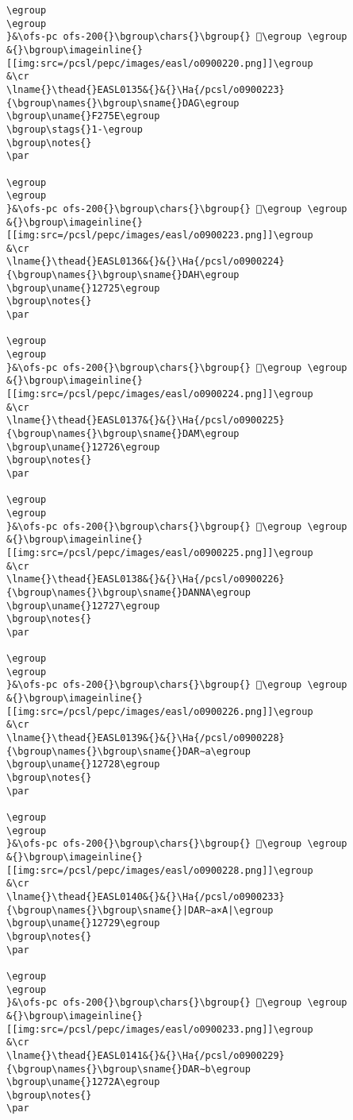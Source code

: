 \begin{verbatim}
\egroup
\egroup
}&\ofs-pc ofs-200{}\bgroup\chars{}\bgroup{} 𒜤\egroup \egroup
&{}\bgroup\imageinline{}[[img:src=/pcsl/pepc/images/easl/o0900220.png]]\egroup
&\cr
\lname{}\thead{}EASL0135&{}&{}\Ha{/pcsl/o0900223}{\bgroup\names{}\bgroup\sname{}DAG\egroup
\bgroup\uname{}F275E\egroup
\bgroup\stags{}1-\egroup
\bgroup\notes{}
\par 

\egroup
\egroup
}&\ofs-pc ofs-200{}\bgroup\chars{}\bgroup{} 󲝞\egroup \egroup
&{}\bgroup\imageinline{}[[img:src=/pcsl/pepc/images/easl/o0900223.png]]\egroup
&\cr
\lname{}\thead{}EASL0136&{}&{}\Ha{/pcsl/o0900224}{\bgroup\names{}\bgroup\sname{}DAH\egroup
\bgroup\uname{}12725\egroup
\bgroup\notes{}
\par 

\egroup
\egroup
}&\ofs-pc ofs-200{}\bgroup\chars{}\bgroup{} 𒜥\egroup \egroup
&{}\bgroup\imageinline{}[[img:src=/pcsl/pepc/images/easl/o0900224.png]]\egroup
&\cr
\lname{}\thead{}EASL0137&{}&{}\Ha{/pcsl/o0900225}{\bgroup\names{}\bgroup\sname{}DAM\egroup
\bgroup\uname{}12726\egroup
\bgroup\notes{}
\par 

\egroup
\egroup
}&\ofs-pc ofs-200{}\bgroup\chars{}\bgroup{} 𒜦\egroup \egroup
&{}\bgroup\imageinline{}[[img:src=/pcsl/pepc/images/easl/o0900225.png]]\egroup
&\cr
\lname{}\thead{}EASL0138&{}&{}\Ha{/pcsl/o0900226}{\bgroup\names{}\bgroup\sname{}DANNA\egroup
\bgroup\uname{}12727\egroup
\bgroup\notes{}
\par 

\egroup
\egroup
}&\ofs-pc ofs-200{}\bgroup\chars{}\bgroup{} 𒜧\egroup \egroup
&{}\bgroup\imageinline{}[[img:src=/pcsl/pepc/images/easl/o0900226.png]]\egroup
&\cr
\lname{}\thead{}EASL0139&{}&{}\Ha{/pcsl/o0900228}{\bgroup\names{}\bgroup\sname{}DAR∼a\egroup
\bgroup\uname{}12728\egroup
\bgroup\notes{}
\par 

\egroup
\egroup
}&\ofs-pc ofs-200{}\bgroup\chars{}\bgroup{} 𒜨\egroup \egroup
&{}\bgroup\imageinline{}[[img:src=/pcsl/pepc/images/easl/o0900228.png]]\egroup
&\cr
\lname{}\thead{}EASL0140&{}&{}\Ha{/pcsl/o0900233}{\bgroup\names{}\bgroup\sname{}|DAR∼a×A|\egroup
\bgroup\uname{}12729\egroup
\bgroup\notes{}
\par 

\egroup
\egroup
}&\ofs-pc ofs-200{}\bgroup\chars{}\bgroup{} 𒜩\egroup \egroup
&{}\bgroup\imageinline{}[[img:src=/pcsl/pepc/images/easl/o0900233.png]]\egroup
&\cr
\lname{}\thead{}EASL0141&{}&{}\Ha{/pcsl/o0900229}{\bgroup\names{}\bgroup\sname{}DAR∼b\egroup
\bgroup\uname{}1272A\egroup
\bgroup\notes{}
\par 


\end{verbatim}
